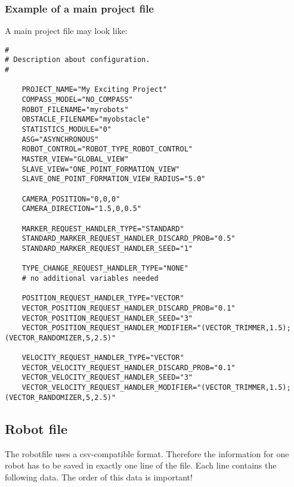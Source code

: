 \subsubsection{Example of a main project file}
A main project file may look like:
\lstset{language=tcl}
\begin{lstlisting}
# 
# Description about configuration.
#
	
	PROJECT_NAME="My Exciting Project"
	COMPASS_MODEL="NO_COMPASS"
	ROBOT_FILENAME="myrobots"
	OBSTACLE_FILENAME="myobstacle"
	STATISTICS_MODULE="0"
	ASG="ASYNCHRONOUS"
	ROBOT_CONTROL="ROBOT_TYPE_ROBOT_CONTROL"
	MASTER_VIEW="GLOBAL_VIEW"
	SLAVE_VIEW="ONE_POINT_FORMATION_VIEW"
	SLAVE_ONE_POINT_FORMATION_VIEW_RADIUS="5.0"
	
	CAMERA_POSITION="0,0,0"
	CAMERA_DIRECTION="1.5,0,0.5"
	
	MARKER_REQUEST_HANDLER_TYPE="STANDARD"
	STANDARD_MARKER_REQUEST_HANDLER_DISCARD_PROB="0.5"
	STANDARD_MARKER_REQUEST_HANDLER_SEED="1"

	TYPE_CHANGE_REQUEST_HANDLER_TYPE="NONE"
	# no additional variables needed

	POSITION_REQUEST_HANDLER_TYPE="VECTOR"
	VECTOR_POSITION_REQUEST_HANDLER_DISCARD_PROB="0.1"
	VECTOR_POSITION_REQUEST_HANDLER_SEED="3"
	VECTOR_POSITION_REQUEST_HANDLER_MODIFIER="(VECTOR_TRIMMER,1.5);(VECTOR_RANDOMIZER,5,2.5)"

	VELOCITY_REQUEST_HANDLER_TYPE="VECTOR"
	VECTOR_VELOCITY_REQUEST_HANDLER_DISCARD_PROB="0.1"
	VECTOR_VELOCITY_REQUEST_HANDLER_SEED="3"
	VECTOR_VELOCITY_REQUEST_HANDLER_MODIFIER="(VECTOR_TRIMMER,1.5);(VECTOR_RANDOMIZER,5,2.5)"
\end{lstlisting}


\subsection{Robot file}
The robotfile uses a csv-compatible format.
Therefore the information for one robot has to be saved in exactly one line of the file.
Each line contains the following data. The order of this data is important!

